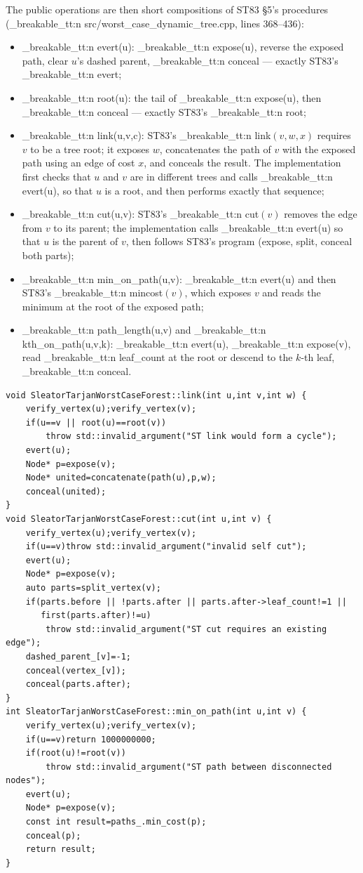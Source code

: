 \documentclass[11pt,a4paper,oneside]{report}
\theoremstyle{plain}
\theoremstyle{definition}
\theoremstyle{remark}
\DeclareRobustCommand{\code}[1]{\mtp_breakable_tt:n {#1}}
\DeclareRobustCommand{\file}[1]{\mtp_breakable_tt:n {#1}}
\begin{document}
The public operations are then short compositions of ST83 \S5's procedures
(\file{src/worst_case_dynamic_tree.cpp}, lines 368--436):
\begin{itemize}
\item \code{evert(u)}: \code{expose(u)}, reverse the exposed path, clear \(u\)'s dashed parent,
  \code{conceal} --- exactly ST83's \code{evert};
\item \code{root(u)}: the tail of \code{expose(u)}, then \code{conceal} --- exactly ST83's
  \code{root};
\item \code{link(u,v,c)}: ST83's \code{link}\((v,w,x)\) requires \(v\) to be a tree root; it
  exposes \(w\), concatenates the path of \(v\) with the exposed path using an edge of cost \(x\),
  and conceals the result. The implementation first checks that
  \(u\) and \(v\) are in different trees and calls \code{evert(u)}, so that \(u\) is a root, and
  then performs exactly that sequence;
\item \code{cut(u,v)}: ST83's \code{cut}\((v)\) removes the edge from \(v\) to its parent; the
  implementation calls \code{evert(u)} so that \(u\) is the parent of \(v\), then follows
  ST83's program (expose, split, conceal both parts);
\item \code{min_on_path(u,v)}: \code{evert(u)} and then ST83's \code{mincost}\((v)\), which
  exposes \(v\) and reads the minimum at the root of the exposed path;
\item \code{path_length(u,v)} and \code{kth_on_path(u,v,k)}: \code{evert(u)}, \code{expose(v)},
  read \code{leaf_count} at the root or descend to the \(k\)-th leaf, \code{conceal}.
\end{itemize}

\begin{lstlisting}[style=cpp,firstnumber=383,caption={\file{src/worst_case_dynamic_tree.cpp}, lines 383--415: \code{link}, \code{cut} and \code{min_on_path}.},label={lst:link-cut}]
void SleatorTarjanWorstCaseForest::link(int u,int v,int w) {
    verify_vertex(u);verify_vertex(v);
    if(u==v || root(u)==root(v))
        throw std::invalid_argument("ST link would form a cycle");
    evert(u);
    Node* p=expose(v);
    Node* united=concatenate(path(u),p,w);
    conceal(united);
}
void SleatorTarjanWorstCaseForest::cut(int u,int v) {
    verify_vertex(u);verify_vertex(v);
    if(u==v)throw std::invalid_argument("invalid self cut");
    evert(u);
    Node* p=expose(v);
    auto parts=split_vertex(v);
    if(parts.before || !parts.after || parts.after->leaf_count!=1 ||
       first(parts.after)!=u)
        throw std::invalid_argument("ST cut requires an existing edge");
    dashed_parent_[v]=-1;
    conceal(vertex_[v]);
    conceal(parts.after);
}
int SleatorTarjanWorstCaseForest::min_on_path(int u,int v) {
    verify_vertex(u);verify_vertex(v);
    if(u==v)return 1000000000;
    if(root(u)!=root(v))
        throw std::invalid_argument("ST path between disconnected nodes");
    evert(u);
    Node* p=expose(v);
    const int result=paths_.min_cost(p);
    conceal(p);
    return result;
}
\end{lstlisting}
\end{document}
